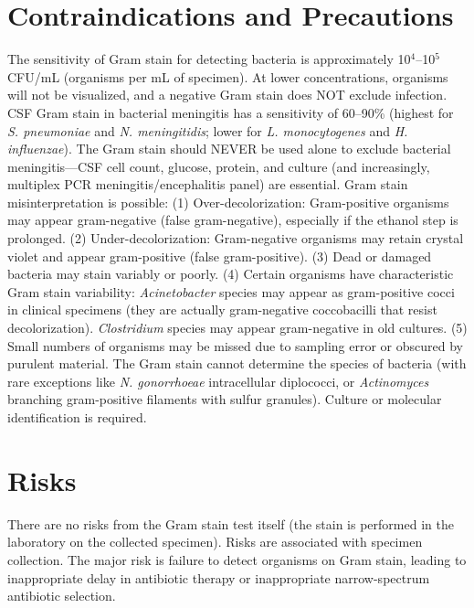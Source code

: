 \section*{Contraindications and Precautions}
The sensitivity of Gram stain for detecting bacteria is approximately 10$^{4}$--10$^{5}$ CFU/mL (organisms per mL of specimen). At lower concentrations, organisms will not be visualized, and a negative Gram stain does NOT exclude infection. CSF Gram stain in bacterial meningitis has a sensitivity of 60--90\% (highest for \textit{S. pneumoniae} and \textit{N. meningitidis}; lower for \textit{L. monocytogenes} and \textit{H. influenzae}). The Gram stain should NEVER be used alone to exclude bacterial meningitis---CSF cell count, glucose, protein, and culture (and increasingly, multiplex PCR meningitis/encephalitis panel) are essential. Gram stain misinterpretation is possible: (1) Over-decolorization: Gram-positive organisms may appear gram-negative (false gram-negative), especially if the ethanol step is prolonged. (2) Under-decolorization: Gram-negative organisms may retain crystal violet and appear gram-positive (false gram-positive). (3) Dead or damaged bacteria may stain variably or poorly. (4) Certain organisms have characteristic Gram stain variability: \textit{Acinetobacter} species may appear as gram-positive cocci in clinical specimens (they are actually gram-negative coccobacilli that resist decolorization). \textit{Clostridium} species may appear gram-negative in old cultures. (5) Small numbers of organisms may be missed due to sampling error or obscured by purulent material. The Gram stain cannot determine the species of bacteria (with rare exceptions like \textit{N. gonorrhoeae} intracellular diplococci, or \textit{Actinomyces} branching gram-positive filaments with sulfur granules). Culture or molecular identification is required.

\section*{Risks}
There are no risks from the Gram stain test itself (the stain is performed in the laboratory on the collected specimen). Risks are associated with specimen collection. The major risk is failure to detect organisms on Gram stain, leading to inappropriate delay in antibiotic therapy or inappropriate narrow-spectrum antibiotic selection.

